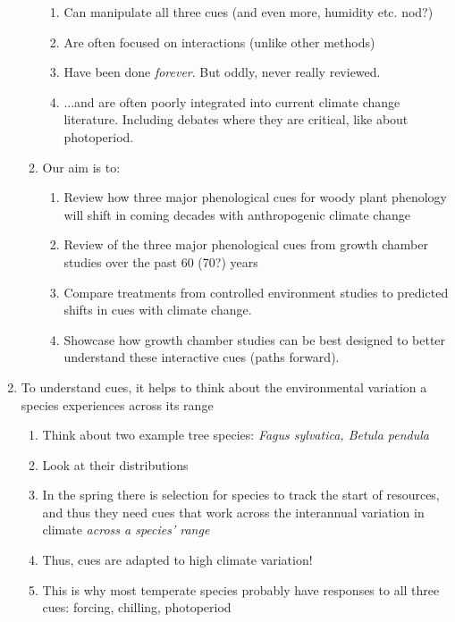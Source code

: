 \documentclass[11pt,letterpaper]{article}
\begin{document}
\begin{enumerate}
\begin{enumerate}
\begin{enumerate}
\item Can manipulate all three cues (and even more, humidity etc. nod?)
\item Are often focused on interactions (unlike other methods)
\item Have been done \emph{forever}. But oddly, never really reviewed.
\item  ...and are often poorly integrated into current climate change literature. Including debates where they are critical, like about photoperiod. 
\end{enumerate}
\item Our aim is to:
\begin{enumerate}
\item Review how three major phenological cues for woody plant phenology will shift in coming decades with anthropogenic climate change
\item Review of the three major phenological cues from growth chamber studies over the past 60 (70?) years
\item Compare treatments from controlled environment studies to predicted shifts in cues with climate change.  
\item Showcase how growth chamber studies can be best designed to better understand these interactive cues (paths forward). 
\end{enumerate}
\end{enumerate}
\item To understand cues, it helps to think about the environmental variation a species experiences across its range
\begin{enumerate}
\item Think about two example tree species: \emph{Fagus sylvatica, Betula pendula}
\item Look at their distributions
\item In the spring there is selection for species to track the start of resources, and thus they need cues that work across the interannual variation in climate \emph{across a species' range} %
\item Thus, cues are adapted to high climate variation! 
\item This is why most temperate species probably have responses to all three cues: forcing, chilling, photoperiod

\end{enumerate}
\end{enumerate}
\end{document}
